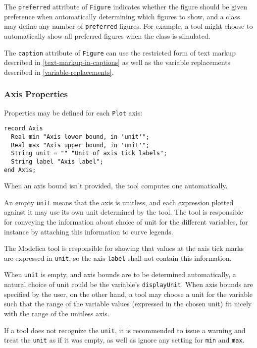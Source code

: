 The \lstinline!preferred! attribute of \lstinline!Figure! indicates whether the figure should be given preference when automatically determining which figures to show,
and a class may define any number of \lstinline!preferred! figures.  For example, a tool might choose to automatically show all preferred figures when the class is simulated.

The \lstinline!caption! attribute of \lstinline!Figure! can use the restricted
form of text markup described in \cref{text-markup-in-captions} as well as
the variable replacements described in \cref{variable-replacements}.

\subsubsection{Axis Properties}\label{axis-properties}

Properties may be defined for each \lstinline!Plot! axis:
\begin{lstlisting}[language=modelica]
record Axis
  Real min "Axis lower bound, in 'unit'";
  Real max "Axis upper bound, in 'unit'";
  String unit = "" "Unit of axis tick labels";
  String label "Axis label";
end Axis;
\end{lstlisting}

When an axis bound isn't provided, the tool computes one automatically.

An empty \lstinline!unit! means that the axis is unitless, and each expression plotted against it may use its own unit determined by the tool.  The tool is responsible for conveying the information
about choice of unit for the different variables, for instance by attaching this information to curve legends.

The Modelica tool is responsible for showing that values at the axis tick marks are expressed in \lstinline!unit!, so the axis \lstinline!label! shall not contain this information.

\begin{nonnormative}
When \lstinline!unit! is empty, and axis bounds are to be determined automatically, a natural choice of unit could be the variable's \lstinline!displayUnit!.  When axis bounds are specified by the
user, on the other hand, a tool may choose a unit for the variable such that the range of the variable values (expressed in the chosen unit) fit nicely with the range of the unitless axis.
\end{nonnormative}

If a tool does not recognize the \lstinline!unit!, it is recommended to issue a warning and treat the \lstinline!unit! as if it was empty, as well as ignore any setting for \lstinline!min! and \lstinline!max!.

